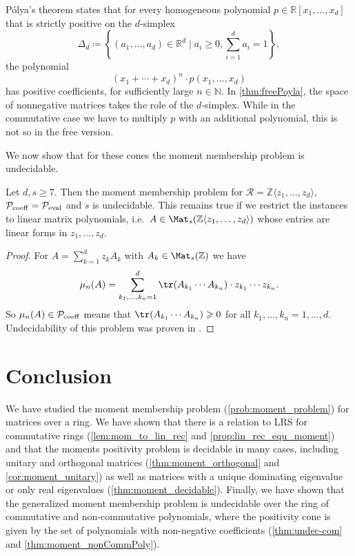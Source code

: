 \begin{remark}
P\'olya's theorem \cite{Po28,Ha52} states that for every homogeneous polynomial $p \in \mathbb{R}[x_1, \ldots, x_d]$ that is strictly positive  on the $d$-simplex
$$\Delta_d \coloneqq \left\{(a_1, \ldots, a_d) \in \mathbb{R}^d\mid  a_i \geqslant 0, \sum_{i = 1}^d a_i = 1 \right\},$$
the polynomial 
$$ (x_1 + \cdots + x_d)^n \cdot p(x_1, \ldots, x_d)$$
has positive coefficients, for sufficiently large $n \in \mathbb{N}$.
In \cref{thm:freePoyla}, the space of nonnegative matrices takes the role of the $d$-simplex. While in the commutative case we have to multiply $p$ with an additional polynomial, this is not so in the free version. \demo
\end{remark}

We now show that for these cones the moment membership problem is undecidable.


\begin{theorem} 
\label{thm:moment_nonCommPoly} Let  $d,s\geqslant 7$. Then  the moment membership problem for $\mathcal R=\mathbb Z\langle z_1,\ldots, z_d\rangle$, $\mathcal P_{\rm coeff}=\mathcal P_{\rm eval}$ and $s$ is undecidable. This remains true if we restrict the instances to linear matrix polynomials, i.e.\  
$A\in \Mat_s(\mathbb Z\langle z_1,\ldots, z_d\rangle)$ whose entries are linear forms in $z_1,\ldots, z_d$.
\end{theorem}

\begin{proof}
For $A=\sum_{k=1}^d z_kA_k$ with $A_k\in \Mat_s(\mathbb Z)$ we have $$\mu_n(A)=\sum_{k_1,\ldots, k_n=1}^d \tr(A_{k_1}\cdots A_{k_n})\cdot z_{k_1}\cdots z_{k_n}.$$ So $\mu_n(A)\in\mathcal P_{\rm coeff}$ means that $\tr(A_{k_1}\cdots A_{k_n})\geqslant 0$ for all $k_1,\ldots, k_n=1,\ldots, d$. Undecidability of this problem was proven in \cite[Lemma 3]{DCCW}. 
\end{proof}


\section{Conclusion}
\label{sec:conclusion}

We have studied the moment membership problem (\cref{prob:moment_problem}) for matrices over a ring. We have shown that there is a relation to LRS for commutative rings (\cref{lem:mom_to_lin_rec} and \cref{prop:lin_rec_equ_moment}) and that the moments positivity problem is decidable in many cases, including unitary and orthogonal matrices (\cref{thm:moment_orthogonal} and \cref{cor:moment_unitary}) as well as matrices with a unique dominating eigenvalue or only real eigenvalues (\cref{thm:moment_decidable}). Finally, we have shown that the generalized moment membership problem is undecidable over the ring of commutative and non-commutative polynomials, where the positivity cone is given by the set of polynomials with non-negative coefficients (\cref{thm:undec-com} and \cref{thm:moment_nonCommPoly}).

